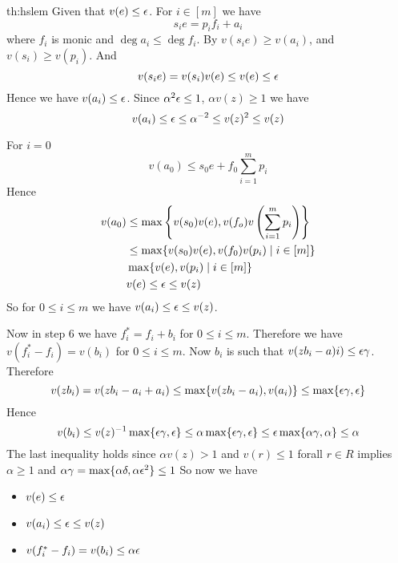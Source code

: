 \begin{proof-of-theorem}{th:hslem}
	Given that $v(e)\leq \epsilon$. For $i\in [m]$ we have \[
		 s_ie=p_if_i+a_i
	\]where $f_i$ is monic and $\deg a_i\leq \deg f_i$. By  $v(s_ie)\geq v(a_i)$, and $v(s_i)\geq v(p_i)$. And \[
		 v(s_ie)=v(s_i)v(e)\leq v(e)\leq \epsilon
	\]
	Hence we have $v(a_i)\leq \epsilon$. Since $\alpha^2 \epsilon \leq 1$, $\alpha v(z)\geq 1$ we have \[
		 v(a_i)\leq \epsilon \leq \alpha^{-2}\leq v(z)^2\leq v(z)
	\]
	
	For $i=0$ \[
		 v(a_0)\leq s_0e+f_0\sum\limits_{i=1}^{m } p_i
	\]	
	Hence\begin{align*}
	v(a_0) & \leq \max\left\{v(s_0)v(e),v(f_o)v\left( \sum\limits_{i=1}^{m } p_i \right)\right\}\\ 
	& \leq \max \{v(s_0)v(e),v(f_0)v(p_i)\mid i\in[m] \}\\ 
	& \max \{v(e),v(p_i)\mid i\in[m]\} \\  
	& v(e)\leq \epsilon\leq v(z)
	\end{align*}
	So for $0\leq i\leq m$ we have $v(a_i)\leq \epsilon\leq v(z)$. 
	
	Now in step 6 we have $f_i^*=f_i+b_i$ for $0\leq i\leq m$. Therefore we have $v(f^*_i-f_i)=v(b_i)$ for $0\leq i\leq m$. Now $b_i$ is such that $v(zb_i-a)i)\leq\epsilon\gamma$. Therefore \[
		 v(zb_i)=v(zb_i-a_i+a_i)\leq\max\{v(zb_i-a_i),v(a_i)\}\leq \max \{\epsilon\gamma,\epsilon\}
	\]Hence $$v(b_i)\leq v(z)^{-1}\max\{\epsilon\gamma,\epsilon\}\leq \alpha\max \{\epsilon\gamma,\epsilon\}\leq \epsilon\max\{\alpha\gamma,\alpha\}\leq \alpha$$The last inequality holds since $\alpha v(z)>1$ and $v(r)\leq 1$ forall $r\in R$ implies $\alpha\geq 1$ and $\alpha\gamma=\max\{\alpha\delta,\alpha\epsilon^2\}\leq 1$
	So now we have \begin{itemize}
		\item $v(e)\leq \epsilon$
		\item $v(a_i)\leq \epsilon\leq v(z)$ 
		\item $v(f_i^*-f_i)=v(b_i)\leq \alpha\epsilon$
	\end{itemize}
	\vspace{3mm}
	

\end{proof-of-theorem}

